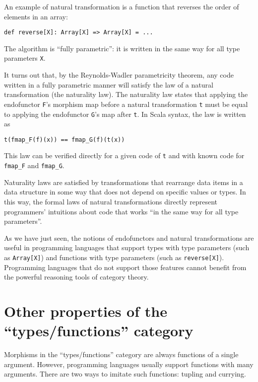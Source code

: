 An example of natural transformation is a function that reverses the
order of elements in an array:
\begin{lstlisting}
def reverse[X]: Array[X] => Array[X] = ...
\end{lstlisting}
The algorithm is \textsf{``}fully parametric\textsf{''}: it is written in the same
way for all type parameters \lstinline!X!.

It turns out that, by the Reynolds-Wadler parametricity theorem, any
code written in a fully parametric manner will satisfy the law of
a natural transformation (the naturality law). The naturality law
states that applying the endofunctor \lstinline!F!\textsf{'}s morphism map
before a natural transformation \lstinline!t! must be equal to applying
the endofunctor \lstinline!G!\textsf{'}s map after \lstinline!t!. In Scala
syntax, the law is written as
\begin{lstlisting}
t(fmap_F(f)(x)) == fmap_G(f)(t(x))
\end{lstlisting}
This law can be verified directly for a given code of \lstinline!t!
and with known code for \lstinline!fmap_F! and \lstinline!fmap_G!.

Naturality laws are satisfied by transformations that rearrange data
items in a data structure in some way that does not depend on specific
values or types. In this way, the formal laws of natural transformations
directly represent programmers\textsf{'} intuitions about code that works \textsf{``}in
the same way for all type parameters\textsf{''}.

As we have just seen, the notions of endofunctors and natural transformations
are useful in programming languages that support types with type parameters
(such as \lstinline!Array[X]!) and functions with type parameters
(such as \lstinline!reverse[X]!). Programming languages that do not
support those features cannot benefit from the powerful reasoning
tools of category theory.

\section{Other properties of the \textquotedblleft types/functions\textquotedblright{}
category}

Morphisms in the \textsf{``}types/functions\textsf{''} category are always functions
of a single argument. However, programming languages usually support
functions with many arguments. There are two ways to imitate such
functions: tupling and currying.

